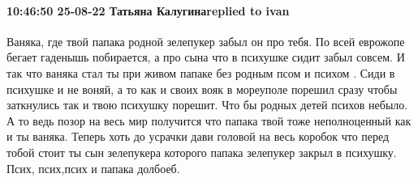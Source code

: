  
 
 
 
 

\paragraph{10:46:50 25-08-22 Татьяна Калугинаreplied to ivan}

Ваняка, где твой папака родной зелепукер забыл он про тебя. По всей еврожопе
бегает гаденышь побирается, а про сына что в психушке сидит забыл совсем. И так
что ваняка стал ты при живом папаке без родным псом и психом . Сиди в психушке
и не воняй, а то как и своих вояк в мореуполе порешил сразу чтобы заткнулись
так и твою психушку порешит. Что бы родных детей психов небыло. А то ведь позор
на весь мир получится что папака твой тоже неполноценный как и ты ваняка.
Теперь хоть до усрачки дави головой на весь коробок что перед тобой стоит ты
сын зелепукера которого папака зелепукер закрыл в психушку. Псих, псих,псих и
папака долбоеб.
